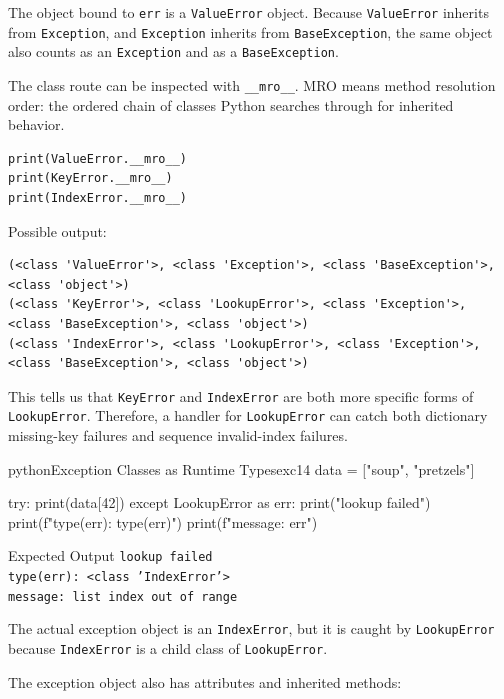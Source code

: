 The object bound to \texttt{err} is a \texttt{ValueError} object. Because \texttt{ValueError} inherits from \texttt{Exception}, and \texttt{Exception} inherits from \texttt{BaseException}, the same object also counts as an \texttt{Exception} and as a \texttt{BaseException}.

The class route can be inspected with \texttt{\_\_mro\_\_}. MRO means method resolution order: the ordered chain of classes Python searches through for inherited behavior.

\begin{verbatim}
print(ValueError.__mro__)
print(KeyError.__mro__)
print(IndexError.__mro__)
\end{verbatim}

Possible output:

\begin{verbatim}
(<class 'ValueError'>, <class 'Exception'>, <class 'BaseException'>, <class 'object'>)
(<class 'KeyError'>, <class 'LookupError'>, <class 'Exception'>, <class 'BaseException'>, <class 'object'>)
(<class 'IndexError'>, <class 'LookupError'>, <class 'Exception'>, <class 'BaseException'>, <class 'object'>)
\end{verbatim}

This tells us that \texttt{KeyError} and \texttt{IndexError} are both more specific forms of \texttt{LookupError}. Therefore, a handler for \texttt{LookupError} can catch both dictionary missing-key failures and sequence invalid-index failures.

\begin{codebox}[]{python}{Exception Classes as Runtime Types}{exc14}
data = ["soup", "pretzels"]

try:
    print(data[42])
except LookupError as err:
    print("lookup failed")
    print(f"type(err): {type(err)}")
    print(f"message: {err}")
\end{codebox}


\begin{iobox}{Expected Output}
\texttt{lookup failed} \\
\texttt{type(err): <class 'IndexError'>} \\
\texttt{message: list index out of range} \\
\end{iobox}


The actual exception object is an \texttt{IndexError}, but it is caught by \texttt{LookupError} because \texttt{IndexError} is a child class of \texttt{LookupError}.

The exception object also has attributes and inherited methods:

